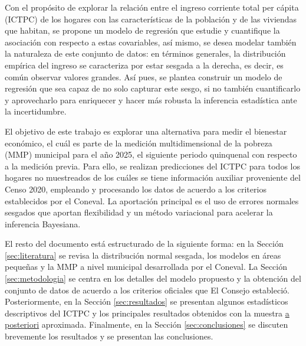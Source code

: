 \documentclass[11pt]{article}
\begin{document}
Con el propósito de explorar la relación entre el ingreso corriente total per cápita (ICTPC) de los hogares con las características de la población y de las viviendas que habitan, se propone un modelo de regresión que estudie y cuantifique la asociación con respecto a estas covariables, así mismo, se desea modelar también la naturaleza de este conjunto de datos: en términos generales, la distribución empírica del ingreso se caracteriza por estar sesgada a la derecha, es decir, es común observar valores grandes. Así pues, se plantea construir un modelo de regresión que sea capaz de no solo capturar este sesgo, si no también cuantificarlo y aprovecharlo para enriquecer y hacer más robusta la inferencia estadística ante la incertidumbre.


El objetivo de este trabajo es explorar una alternativa para medir el bienestar económico, el cuál es parte de la medición multidimensional de la pobreza (MMP) municipal para el año 2025, el siguiente periodo quinquenal con respecto a la medición previa. Para ello, se realizan predicciones del ICTPC para todos los hogares no muestreados de los cuáles se tiene información auxiliar proveniente del Censo 2020, empleando y procesando los datos de acuerdo a los criterios establecidos por el Coneval. La aportación principal es el uso de errores normales sesgados que aportan flexibilidad y un método variacional para acelerar la inferencia Bayesiana. 

El resto del documento está estructurado de la siguiente forma: en la Sección \ref{sec:literatura} se revisa la distribución normal sesgada, los modelos en áreas pequeñas y la MMP a nivel municipal desarrollada por el Coneval. La Sección \ref{sec:metodologia} se centra en los detalles del modelo propuesto y la obtención del conjunto de datos de acuerdo a los criterios oficiales que El Consejo estableció.
Posteriormente, en la Sección \ref{sec:resultados} se presentan algunos estadísticos descriptivos del ICTPC y los principales resultados obtenidos con la muestra \underline{a posteriori} aproximada. Finalmente, en la Sección \ref{sec:conclusiones} se discuten brevemente los resultados y se presentan las conclusiones.
\end{document}
